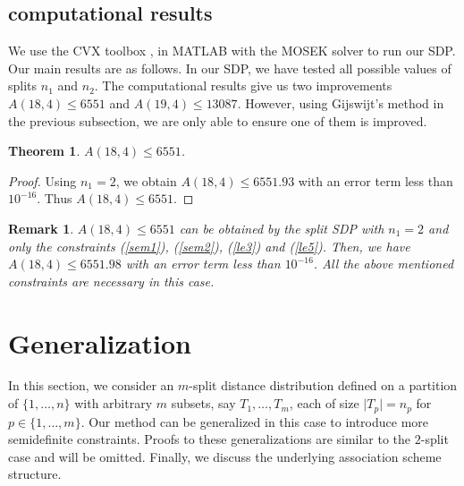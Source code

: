 \documentclass[final,onecolumn]{IEEEtran}
\newtheorem{theoremenv}[definitionenv]{Theorem}
\newtheorem{remarkenv}[definitionenv]{Remark}
\newenvironment{remark}{\begin{remarkenv}\rm}{\end{remarkenv}}
\newenvironment{theorem}{\begin{theoremenv}\rm}{\end{theoremenv}}
\theoremstyle{definition}
\begin{document}
\subsection{computational results}
We use the CVX toolbox \cite{GB14}, \cite{GB08} in MATLAB with the MOSEK solver  to run our SDP. Our main results are as follows. In our SDP,  we have tested all possible values of splits $n_{1}$ and $n_{2}$. The computational results give us two improvements	$A(18,4) \leq 6551$ and 	$A(19,4) \leq 13087$. However, using Gijswijt's method in the previous subsection, we are only able to ensure one of them is improved.
\begin{theorem}
	$A(18,4) \leq 6551$.
\end{theorem}
\begin{proof}
    Using $n_{1} = 2$, we obtain $A(18,4)\leq 6551.93$ with an error term less than $10^{-16}$. Thus $A(18,4)\leq 6551$.
\end{proof}

\begin{remark}
$A(18,4) \leq 6551$ can be obtained by the split SDP with $n_{1} = 2$ and only the constraints (\ref{sem1}), (\ref{sem2}), (\ref{le3}) and (\ref{le5}). Then, we have $A(18,4) \leq 6551.98$ with an error term less than $10^{-16}$. All the above mentioned constraints are necessary in this case.
\end{remark}

\section{Generalization}
\label{sec:gener}
In this section, we  consider an $m$-split distance distribution defined on  a partition of $\{1, \dots, n\}$ with  arbitrary $m$ subsets, say $T_{1}, \dots, T_{m}$,  each of size $\lvert T_{p}\rvert = n_{p}$ for $p \in \{1, \dots, m\}$. Our method can be generalized in this case to introduce more semidefinite constraints. Proofs to these generalizations are similar to the $2$-split case and will be omitted. Finally, we discuss the underlying association scheme structure.\\

	
\end{document}
